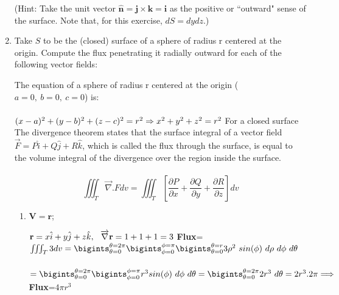 \documentclass[fleqn]{article}
\begin{document}
\begin{enumerate}
\begin{enumerate}
      \end{enumerate}
      (Hint: Take the unit vector $\mathbf{\hat n}=\mathbf{j} \times \mathbf{k} = \mathbf{i}$ as the positive or ``outward" sense of the surface. Note that, for this exercise, $dS=dy dz$.)

    \pagebreak

    \item Take $S$ to be the (closed) surface of a sphere of radius r centered at the origin. Compute the flux penetrating it radially outward for each of the following vector fields:
      
      \textcolor{hwColor}{
        The equation of a sphere of radius r centered at the origin ($a=0, ~ b=0, ~ c=0$) is: \\
        \\
        $
          (x-a)^2+(y-b)^2+(z-c)^2=r^2 \Rightarrow x^2+y^2+z^2=r^2 \\ \\
        $ 
        For a closed surface The divergence theorem states that the surface integral of a vector field $\overrightarrow{F}=P \hat{i}+Q \hat{j}+R \hat{k}$, which is called the flux 
        through the surface, is equal to the volume integral of the divergence over the region inside the surface. \\
        \\
        $$\iiint_T \overrightarrow{\nabla}.F dv=\iiint_T \left[\dfrac{\partial P}{\partial x}+\dfrac{\partial Q}{\partial y}+\dfrac{\partial R}{\partial z}\right] dv$$
      }

      \begin{enumerate}
        \item $\mathbf{V}=\mathbf{r}$;
        
          \textcolor{hwColor}{
            $\mathbf{r}=x \hat{i}+y \hat{j}+z \hat{k}, ~~ \overrightarrow{\nabla}\mathbf{r}=1+1+1=3 \\ \\$
            \textbf{Flux}=$\iiint_T 3dv=\bigints_{\theta=0}^{\theta=2 \pi} \bigints_{\phi=0}^{\phi=\pi} \bigints_{\theta=0}^{\theta=r} 3 \rho^2 ~ sin(\phi) ~ d\rho ~ d\phi ~ d\theta$ \\ \\
            $
              =\bigints_{\theta=0}^{\theta=2 \pi} \bigints_{\phi=0}^{\phi=\pi} r^3 sin(\phi) ~ d\phi ~ d\theta=\bigints_{\theta=0}^{\theta=2 \pi}  2r^3 ~ d\theta=2r^3.2\pi \\
              \\
              \\
              \Longrightarrow 
            $
            \textbf{Flux}=$4\pi r^3$
          }


\end{enumerate}
\end{enumerate}
\end{document}
